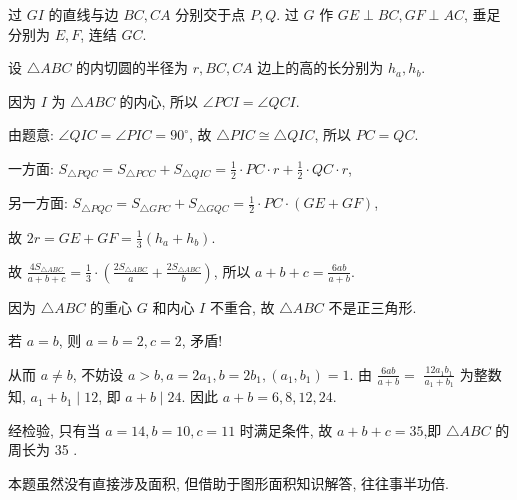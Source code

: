 \documentclass{March}
\begin{document}
\begin{solution}
	过 $G I$ 的直线与边 $B C ,  C A$ 分别交于点 $P ,  Q$. 过 $G$ 作 $G E \perp B C, G F \perp A C$, 垂足分别为 $E ,  F$, 连结 $G C$.

	设 $\triangle A B C$ 的内切圆的半径为 $r, B C ,  C A$ 边上的高的长分别为 $h_a, h_b$.

	因为 $I$ 为 $\triangle A B C$ 的内心, 所以 $\angle P C I=\angle Q C I$.

	由题意: $\angle Q I C=\angle P I C=90^{\circ}$, 故 $\triangle P I C \cong \triangle Q I C$, 所以 $P C=Q C$.

	一方面: $S_{\triangle P Q C}=S_{\triangle P C C}+S_{\triangle Q I C}=\frac{1}{2} \cdot P C \cdot r+\frac{1}{2} \cdot Q C \cdot r$,

	另一方面: $S_{\triangle P Q C}=S_{\triangle G P C}+S_{\triangle G Q C}=\frac{1}{2} \cdot P C \cdot(G E+G F)$,

	故 $2 r=G E+G F=\frac{1}{3}\left(h_a+h_b\right)$.

	故 $\frac{4 S_{\triangle A B C}}{a+b+c}=\frac{1}{3} \cdot\left(\frac{2 S_{\triangle A B C}}{a}+\frac{2 S_{\triangle A B C}}{b}\right)$, 所以 $a+b+c=\frac{6 a b}{a+b}$.

	因为 $\triangle A B C$ 的重心 $G$ 和内心 $I$ 不重合, 故 $\triangle A B C$ 不是正三角形.

	若 $a=b$, 则 $a=b=2, c=2$, 矛盾!

	从而 $a \neq b$, 不妨设 $a>b, a=2 a_1, b=2 b_1,\left(a_1, b_1\right)=1$. 由 $\frac{6 a b}{a+b}=$ $\frac{12 a_1 b_1}{a_1+b_1}$ 为整数知, $a_1+b_1 \mid 12$, 即 $a+b \mid 24$. 因此 $a+b=6,8,12,24$.

	经检验, 只有当 $a=14, b=10, c=11$ 时满足条件, 故 $a+b+c=35$,即 $\triangle A B C$ 的周长为 35 .
\end{solution}
\begin{note}
	本题虽然没有直接涉及面积, 但借助于图形面积知识解答, 往往事半功倍.
\end{note}
\end{document}
